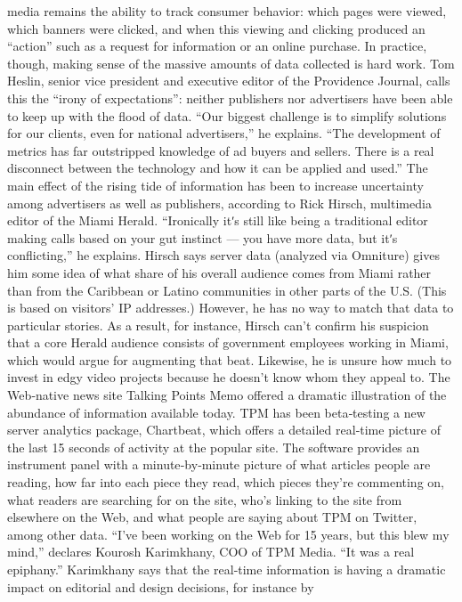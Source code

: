 media remains the ability to track consumer behavior: which pages were
viewed, which banners were clicked, and when this viewing and clicking
produced an ``action'' such as a request for information or an online
purchase. In practice, though, making sense of the massive amounts of
data collected is hard work.
Tom Heslin, senior vice president and executive editor of the Providence
Journal, calls this the ``irony of expectations'': neither publishers nor
advertisers have been able to keep up with the flood of data. ``Our biggest
challenge is to simplify solutions for our clients, even for national
advertisers,'' he explains. ``The development of metrics has far outstripped
knowledge of ad buyers and sellers. There is a real disconnect between the
technology and how it can be applied and used.''
The main effect of the rising tide of information has been to increase
uncertainty among advertisers as well as publishers, according to Rick
Hirsch, multimedia editor of the Miami Herald. ``Ironically itʹs still like
being a traditional editor making calls based on your gut instinct — you
have more data, but itʹs conflicting,'' he explains.
Hirsch says server data (analyzed via Omniture) gives him some idea of
what share of his overall audience comes from Miami rather than from the
Caribbean or Latino communities in other parts of the U.S. (This is based
on visitors’ IP addresses.) However, he has no way to match that data to
particular stories. As a result, for instance, Hirsch can’t confirm his
suspicion that a core Herald audience consists of government employees
working in Miami, which would argue for augmenting that beat.
Likewise, he is unsure how much to invest in edgy video projects because
he doesn’t know whom they appeal to.
The Web‐native news site Talking Points Memo offered a dramatic
illustration of the abundance of information available today. TPM has
been beta‐testing a new server analytics package, Chartbeat, which offers
a detailed real‐time picture of the last 15 seconds of activity at the popular
site. The software provides an instrument panel with a minute‐by‐minute
picture of what articles people are reading, how far into each piece they
read, which pieces they’re commenting on, what readers are searching for
on the site, who’s linking to the site from elsewhere on the Web, and what
people are saying about TPM on Twitter, among other data.
``I’ve been working on the Web for 15 years, but this blew my mind,''
declares Kourosh Karimkhany, COO of TPM Media. ``It was a real
epiphany.'' Karimkhany says that the real‐time information is having a
dramatic impact on editorial and design decisions, for instance by
